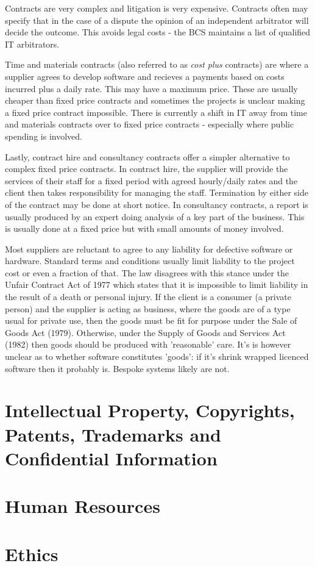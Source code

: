 \documentclass{article}
\begin{document}
	\par Contracts are very complex and litigation is very expensive. Contracts often may specify that in the case of a dispute the opinion of an independent arbitrator will decide the outcome. This avoids legal costs - the BCS maintains a list of qualified IT arbitrators.
	
	\par Time and materials contracts (also referred to as \textit{cost plus} contracts) are where a supplier agrees to develop software and recieves a payments based on costs incurred plus a daily rate. This may have a maximum price. These are usually cheaper than fixed price contracts and sometimes the projects is unclear making a fixed price contract impossible. There is currently a shift in IT away from time and materials contracts over to fixed price contracts - especially where public spending is involved.
	
	Lastly, contract hire and consultancy contracts offer a simpler alternative to complex fixed price contracts. In contract hire, the supplier will provide the services of their staff for a fixed period with agreed hourly/daily rates and the client then takes responsibility for managing the staff. Termination by either side of the contract may be done at short notice. In consultancy contracts, a report is usually produced by an expert doing analysis of a key part of the business. This is usually done at a fixed price but with small amounts of money involved.
	
	\par 
	Most suppliers are reluctant to agree to any liability for defective software or hardware. Standard terms and conditions usually limit liability to the project cost or even a fraction of that. The law disagrees with this stance under the Unfair Contract Act of 1977 which states that it is impossible to limit liability in the result of a death or personal injury. If the client is a consumer (a private person) and the supplier is acting as business, where the goods are of a type usual for private use, then the goods must be fit for purpose under the Sale of Goods Act (1979). Otherwise, under the Supply of Goods and Services Act (1982) then goods should be produced with 'reasonable' care. It's is however unclear as to whether software constitutes 'goods': if it's shrink wrapped licenced software then it probably is. Bespoke systems likely are not.
	
	\section{Intellectual Property, Copyrights, Patents, Trademarks and Confidential Information}
	
	\section{Human Resources}
	
	\section{Ethics}
	\newpage
	\printindex	
	
\end{document}
